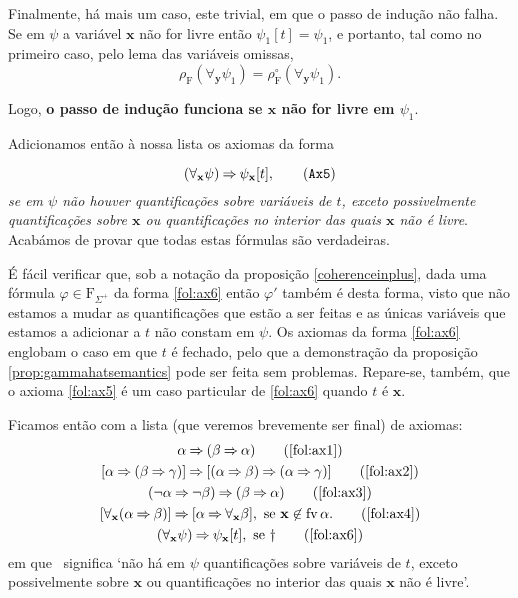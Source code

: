 \documentclass{report}
\theoremstyle{definition}
\theoremstyle{remark}
\renewcommand{\bf}[1]{\mathbf{#1}}
\newcommand{\F}{\mathrm{F}}
\DeclareMathOperator{\fv}{fv}
\newcommand{\imply}{\mathbin{\Rightarrow}}
\begin{document}
\begin{itemize}
	Finalmente, há mais um caso, este trivial, em que o passo de indução não falha. Se em $\psi$ a variável $\bf x$ não for livre então $\psi_1[t] = \psi_1$, e portanto, tal como no primeiro caso, pelo lema das variáveis omissas,
\[\rho_\F(\forall_{\bf y} \psi_1) = \rho^\circ_\F(\forall_{\bf y} \psi_1).\]

	Logo, \textbf{o passo de indução funciona se $\bf x$ não for livre em $\psi_1$}.
	\end{itemize}

	Adicionamos então à nossa lista os axiomas da forma

	\begin{equation}\label{fol:ax6}
	(\forall_{\bf x} \psi) \imply \psi_{\bf x}[t],\tag{\texttt{Ax5}}
	\end{equation}
	\emph{se em $\psi$ não houver quantificações sobre variáveis de $t$, exceto possivelmente quantificações sobre $\bf x$ ou quantificações no interior das quais $\bf x$ não é livre}. Acabámos de provar que todas estas fórmulas são verdadeiras.

	É fácil verificar que, sob a notação da proposição \ref{coherenceinplus}, dada uma fórmula $\varphi \in \F_{\Sigma^+}$ da forma \eqref{fol:ax6} então $\varphi'$ também é desta forma, visto que não estamos a mudar as quantificações que estão a ser feitas e as únicas variáveis que estamos a adicionar a $t$ não constam em $\psi$. Os axiomas da forma \eqref{fol:ax6} englobam o caso em que $t$ é fechado, pelo que a demonstração da proposição \ref{prop:gammahatsemantics} pode ser feita sem problemas. Repare-se, também, que o axioma \eqref{fol:ax5} é um caso particular de \eqref{fol:ax6} quando $t$ é $\bf x$.

	Ficamos então com a lista (que veremos brevemente ser final) de axiomas:
	\begin{gather}
	\alpha \imply (\beta \imply \alpha)\tag{\ref{fol:ax1}}\\
	[\alpha \imply (\beta \imply \gamma)] \imply [(\alpha \imply \beta) \imply (\alpha \imply \gamma)]\tag{\ref{fol:ax2}}\\
	(\neg \alpha \imply \neg \beta) \imply (\beta \imply \alpha)\tag{\ref{fol:ax3}}\\
	[\forall_{\bf x}(\alpha \imply \beta)] \imply [\alpha \imply \forall_{\bf x} \beta], \text{ se $\bf x \not \in \fv \alpha$.} \tag{\ref{fol:ax4}}\\
	(\forall_{\bf x} \psi) \imply \psi_{\bf x}[t], \text{ se \dag} \tag{\ref{fol:ax6}}
	\end{gather}
	em que \dag\ significa `não há em $\psi$ quantificações sobre variáveis de $t$, exceto possivelmente sobre $\bf x$ ou quantificações no interior das quais $\bf x$ não é livre'.
\end{document}
